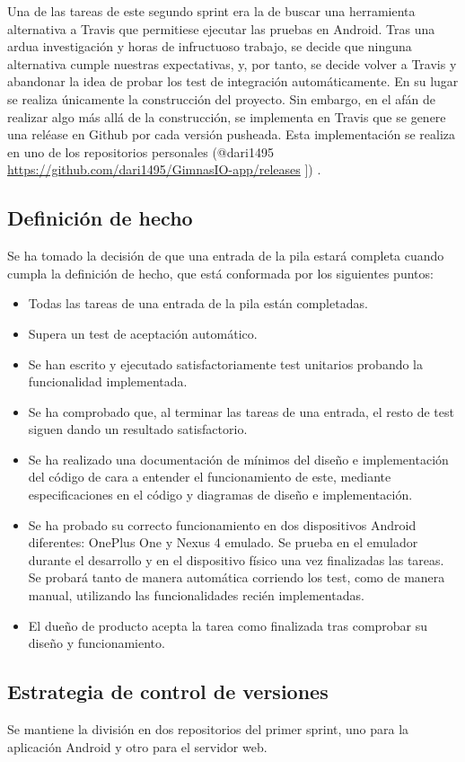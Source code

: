 \documentclass[11pt,a4paper]{report}
\begin{document}
Una de las tareas de este segundo sprint era la de buscar una herramienta alternativa a Travis que permitiese ejecutar las pruebas en Android. Tras una ardua investigación y horas de infructuoso trabajo, se decide que ninguna alternativa cumple nuestras expectativas, y, por tanto, se decide volver a Travis y abandonar la idea de probar los test de integración automáticamente. En su lugar se realiza únicamente la construcción del proyecto. Sin embargo, en el afán de realizar algo más allá de la construcción, se implementa en Travis que se genere una reléase en Github por cada versión pusheada. Esta implementación se realiza en uno de los repositorios personales (@dari1495 \url{https://github.com/dari1495/GimnasIO-app/releases} ]) .
\subsection{Definición de hecho}
Se ha tomado la decisión de que una entrada de la pila estará completa cuando cumpla la definición de hecho, que está conformada por los siguientes puntos:
\begin{itemize}
	\item Todas las tareas de una entrada de la pila están completadas.
	\item Supera un test de aceptación automático.
	\item Se han escrito y ejecutado satisfactoriamente test unitarios probando la funcionalidad implementada.
	\item Se ha comprobado que, al terminar las tareas de una entrada, el resto de test siguen dando un resultado satisfactorio.
	\item Se ha realizado una documentación de mínimos del diseño e implementación del código de cara a entender el funcionamiento de este, mediante especificaciones en el código y diagramas de diseño e implementación.
	\item Se ha probado su correcto funcionamiento en dos dispositivos Android diferentes: OnePlus One y Nexus 4 emulado. Se prueba en el emulador durante el desarrollo y en el dispositivo físico una vez finalizadas las tareas. Se probará tanto de manera automática corriendo los test, como de manera manual, utilizando las funcionalidades recién implementadas.
	\item El dueño de producto acepta la tarea como finalizada tras comprobar su diseño y funcionamiento.
\end{itemize}
\subsection{Estrategia de control de versiones}
Se mantiene la división en dos repositorios del primer sprint, uno para la aplicación Android y otro para el servidor web. 
\end{document}
